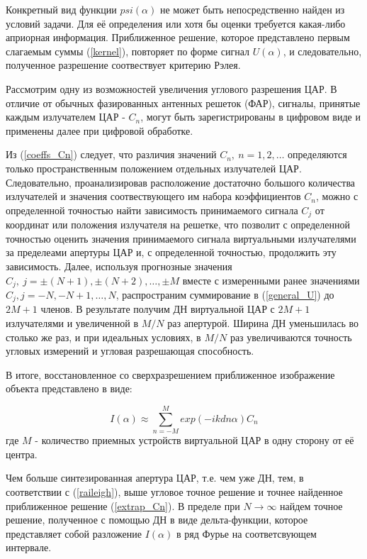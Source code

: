 \documentclass{article}
\begin{document}
	Конкретный вид функции $psi(\alpha)$ не может быть непосредственно найден из условий задачи. Для её определения или хотя бы оценки требуется какая-либо априорная информация. Приближенное решение, которое представлено первым слагаемым суммы (\ref{kernel}), повторяет по форме сигнал $U(\alpha)$, и следовательно, полученное разрешение соотвествует критерию Рэлея.
	
	Рассмотрим одну из возможностей увеличения углового разрешения ЦАР. В отличие от обычных фазированных антенных решеток (ФАР), сигналы, принятые каждым излучателем ЦАР - $C_n$, могут быть зарегистрированы в цифровом виде и применены далее при цифровой обработке.
	
	Из (\ref{coeffs_Cn}) следует, что различия значений $C_n,\ n = 1, 2, \dots$ определяются только пространственным положением отдельных излучателей ЦАР. Следовательно, проанализировав расположение достаточно большого количества излучателей и значения соотвествующего им набора коэффициентов $C_n$, можно с определенной точностью найти зависимость принимаемого сигнала $C_j$ от координат или положения излучателя на решетке, что позволит с определенной точностью оценить значения принимаемого сигнала виртуальными излучателями за пределеами апертуры ЦАР и, с определенной точностью, продолжить эту зависимость. Далее, используя прогнозные значения $C_j, \ j = \pm (N+1), \pm (N+2), \dots, \pm M$ вместе с измеренными ранее значениями $C_j, j = -N, -N + 1, \dots, N$, распространим суммирование в (\ref{general_U}) до $2M + 1$ членов.
	В результате получим ДН виртуальной ЦАР с $2M + 1$ излучателями и увеличенной в $M/N$ раз апертурой. Ширина ДН уменьшилась во столько же раз, и при идеальных условиях, в $M/N$ раз увеличиваются точность угловых измерений и угловая разрешающая способность.
	
	В итоге, восстановленное со сверхразрешением приближенное изображение объекта представлено в виде:
	
	\begin{equation} \label{extrap_Cn}
		I(\alpha) \approx \sum_{n = - M}^{M} exp(-ikdn\alpha)C_n
	\end{equation}
	где $M$ - количество приемных устройств виртуальной ЦАР в одну сторону от её центра.
	
	Чем больше синтезированная апертура ЦАР, т.е. чем уже ДН, тем, в соответствии с (\ref{raileigh}), выше угловое точное решение и точнее найденное приближенное решение (\ref{extrap_Cn}). В пределе при $N \to \infty$ найдем точное решение, полученное с помощью ДН в виде дельта-функции, которое представляет собой разложение $I(\alpha)$ в ряд Фурье на соответсвующем интервале.
	
\end{document}
